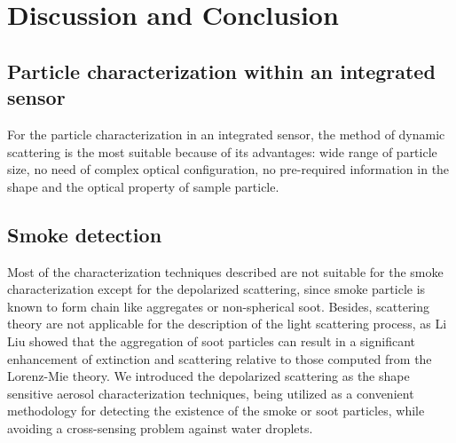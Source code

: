 \documentclass[12pt]{article}
\begin{document}
\section{Discussion and Conclusion}
\label{sec:discussion_conclusion}
\subsection{Particle characterization within an integrated sensor}
For the particle characterization in an integrated sensor, the method of dynamic scattering is the most suitable because of its advantages: wide range of particle size, no need of complex optical configuration, no pre-required information in the shape and the optical property of sample particle.
\subsection{Smoke detection}
Most of the characterization techniques described are not suitable for the smoke characterization except for the depolarized scattering, since smoke particle is known to form chain like aggregates or non-spherical soot. Besides, scattering theory are not applicable for the description of the light scattering process, as Li Liu showed that the aggregation of soot particles can result in a significant enhancement of extinction and scattering relative to those computed from the Lorenz-Mie theory\cite{Experiment1_Depolarization}. 
We introduced the depolarized scattering as the shape sensitive aerosol characterization techniques, being utilized as a convenient methodology for detecting the existence of the smoke or soot particles, while avoiding a cross-sensing problem against water droplets\cite{Patent_Depolarization}.

\newpage


\end{document}
